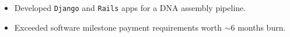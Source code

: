 \documentclass[margin, a4paper]{res}
\begin{document}
\begin{sloppypar}
\begin{resume}
\begin{itemize}
\end{itemize}

\begin{itemize}
\item Developed \texttt{Django} and \texttt{Rails} apps for a DNA assembly pipeline.
\item Exceeded software milestone payment requirements worth $\sim$6 months burn.
\end{itemize}





\end{resume}
\end{sloppypar}
\end{document}
